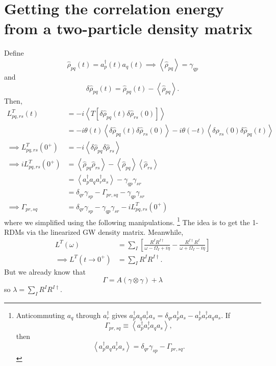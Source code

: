 \section{Getting the correlation energy from a two-particle density matrix }
Define
\begin{equation}
    \hat{\rho}_{p q}(t)=a_p^{\dagger}(t) a_q(t)\implies \left\langle\hat{\rho}_{p q}\right\rangle=\gamma_{q p}
\end{equation}
and
\begin{equation}
    \delta \hat{\rho}_{p q}(t)=\hat{\rho}_{p q}(t)-\left\langle\hat{\rho}_{p q}\right\rangle.
\end{equation}
Then,
\begin{align}
    L_{p q, r s}^T(t)&=-i\left\langle T\left[\delta \hat{\rho}_{p q}(t) \delta \hat{\rho}_{r s}(0)\right]\right\rangle \\
&=-i \theta(t)\left\langle\delta \hat{\rho}_{p q}(t) \delta \hat{\rho}_{r s}(0)\right\rangle-i \theta(-t)\left\langle\delta \hat{\rho}_{r s}(0) \delta \hat{\rho}_{p q}(t)\right\rangle \\
\implies
L_{p q, r s}^T\left(0^{+}\right)&=-i\left\langle\delta \hat{\rho}_{p q} \delta \hat{\rho}_{r s}\right\rangle \\
\implies
i L_{p q, r s}^T\left(0^{+}\right)&=\left\langle\hat{\rho}_{p q} \hat{\rho}_{r s}\right\rangle-\left\langle\hat{\rho}_{p q}\right\rangle\left\langle\hat{\rho}_{r s}\right\rangle \\
&=\left\langle a_p^{\dagger} a_q a_r^{\dagger} a_s\right\rangle-\gamma_{q p} \gamma_{s r} \\
&=\delta_{q r} \gamma_{s p}-\Gamma_{p r, s q}-\gamma_{q p} \gamma_{s r}\\
\implies \Gamma_{p r, s q}&=\delta_{q r} \gamma_{s p}-\gamma_{q p} \gamma_{s r}-i L_{p q, r s}^T\left(0^{+}\right)
\end{align}
where we simplified using the following manipulations.
\footnote{
Anticommuting $a_q$ through $a_r^{\dagger}$ gives $a_p^{\dagger} a_q a_r^{\dagger} a_s=\delta_{q r} a_p^{\dagger} a_s-a_p^{\dagger} a_r^{\dagger} a_q a_s$.
If
$$
\Gamma_{p r, s q} \equiv\left\langle a_p^{\dagger} a_r^{\dagger} a_q a_s\right\rangle,
$$
then
$$
\left\langle a_p^{\dagger} a_q a_r^{\dagger} a_s\right\rangle=\delta_{q r} \gamma_{s p}-\Gamma_{p r, s q} .
$$}
The idea is to get the 1-RDMs via the linearized GW density matrix. Meanwhile, 
\begin{align}
    L^T(\omega)&=\sum_I\left[\frac{R^I R^{I \dagger}}{\omega-\Omega_I+i \eta}-\frac{R^{I \dagger} R^I}{\omega+\Omega_I-i \eta}\right]\\
\implies L^T(t\rightarrow0^+)&=\sum_I R^I R^{I \dagger}.
\end{align}
But we already know that
\begin{equation}
\Gamma=A(\gamma \otimes \gamma)+\lambda
\end{equation}
so $\lambda = \sum_I R^I R^{I \dagger}$.
\newpage
